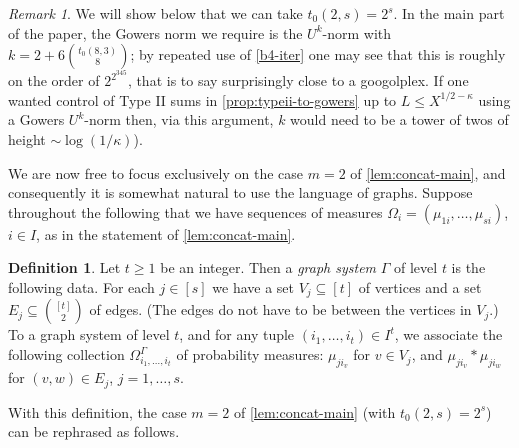 \documentclass[11pt,reqno]{amsart}
\numberwithin{equation}{section}
\theoremstyle{definition}
\newtheorem{definition}[theorem]{Definition}
\theoremstyle{remark}
\newtheorem*{remark}{Remark}
\renewcommand{\le}{\leqslant}
\renewcommand{\ge}{\geqslant}
\begin{document}
\begin{remark}\label{rmk:height}
   We will show below that we can take $t_0(2,s) = 2^s$. In the main part of the paper, the Gowers norm we require is the $U^k$-norm with $k = 2 + 6 \binom{t_0(8,3)}{8}$; by repeated use of \cref{b4-iter} one may see that this is roughly on the order of $2^{2^{345}}$, that is to say surprisingly close to a googolplex. If one wanted control of Type II sums in \cref{prop:typeii-to-gowers} up to $L \le X^{1/2 - \kappa}$ using a Gowers $U^k$-norm then, via this argument, $k$ would need to be a tower of twos of height $\sim \log(1/\kappa)$). 
\end{remark}

We are now free to focus exclusively on the case $m = 2$ of \cref{lem:concat-main}, and consequently it is somewhat natural to use the language of graphs. Suppose throughout the following that we have sequences of measures $\Omega_i = (\mu_{1i}, \dots, \mu_{si})$, $i \in I$, as in the statement of \cref{lem:concat-main}.

\begin{definition}\label{graph-system-def}
Let $t \ge 1$ be an integer. Then a \emph{graph system} $\Gamma$ of level $t$ is the following data. For each $j \in [s]$ we have a set $V_j \subseteq [t]$ of vertices and a set $E_j \subseteq \binom{[t]}{2}$ of edges. (The edges do not have to be between the vertices in $V_j$.)  To a graph system of level $t$, and for any tuple $(i_1,\dots, i_t) \in I^t$, we associate the following collection $\Omega^{\Gamma}_{i_1,\dots, i_t}$ of probability measures: $\mu_{ji_v}$ for $v \in V_j$, and $\mu_{ji_v} \ast \mu_{ji_w}$ for $(v,w) \in E_j$, $j = 1,\dots, s$.  
\end{definition}

With this definition, the case $m = 2$ of \cref{lem:concat-main} (with $t_0(2,s) = 2^s$) can be rephrased as follows.
\end{document}
